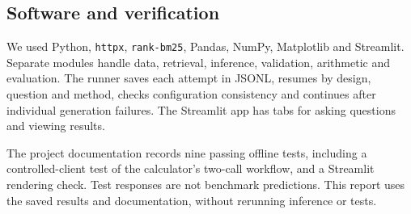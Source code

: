 \documentclass[11pt,a4paper]{article}
\newcommand{\code}[1]{\texttt{#1}}
\begin{document}
\subsection{Software and verification}
We used Python, \code{httpx}, \code{rank-bm25}, Pandas, NumPy, Matplotlib and Streamlit. Separate modules handle data, retrieval, inference, validation, arithmetic and evaluation. The runner saves each attempt in JSONL, resumes by design, question and method, checks configuration consistency and continues after individual generation failures. The Streamlit app has tabs for asking questions and viewing results.

The project documentation records nine passing offline tests, including a controlled-client test of the calculator's two-call workflow, and a Streamlit rendering check. Test responses are not benchmark predictions. This report uses the saved results and documentation, without rerunning inference or tests.
\newpage
\end{document}
